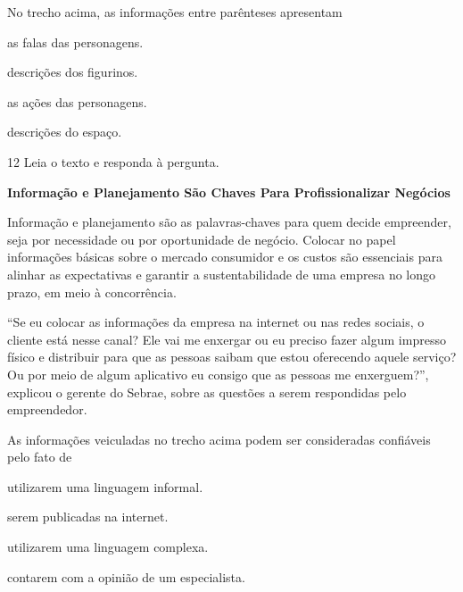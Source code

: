 No trecho acima, as informações entre parênteses apresentam

\begin{escolha}
  \item as falas das personagens.

  \item descrições dos figurinos.

  \item as ações das personagens.

  \item descrições do espaço.
\end{escolha}


\num{12} Leia o texto e responda à pergunta.

\begin{myquote}
\textbf{Informação e Planejamento São Chaves Para Profissionalizar Negócios}

Informação e planejamento são as palavras-chaves para quem decide
empreender, seja por necessidade ou por oportunidade de negócio. Colocar
no papel informações básicas sobre o mercado consumidor e os custos são
essenciais para alinhar as expectativas e garantir a sustentabilidade de
uma empresa no longo prazo, em meio à concorrência.

``Se eu colocar as informações da empresa na internet ou nas redes
sociais, o cliente está nesse canal? Ele vai me enxergar ou eu preciso
fazer algum impresso físico e distribuir para que as pessoas saibam que
estou oferecendo aquele serviço? Ou por meio de algum aplicativo eu
consigo que as pessoas me enxerguem?'', explicou o gerente do Sebrae,
sobre as questões a serem respondidas pelo empreendedor.

\end{myquote}

As informações veiculadas no trecho acima podem ser consideradas
confiáveis pelo fato de

\begin{escolha}
  \item utilizarem uma linguagem informal.

  \item serem publicadas na internet.

  \item utilizarem uma linguagem complexa.

  \item contarem com a opinião de um especialista.
\end{escolha}

